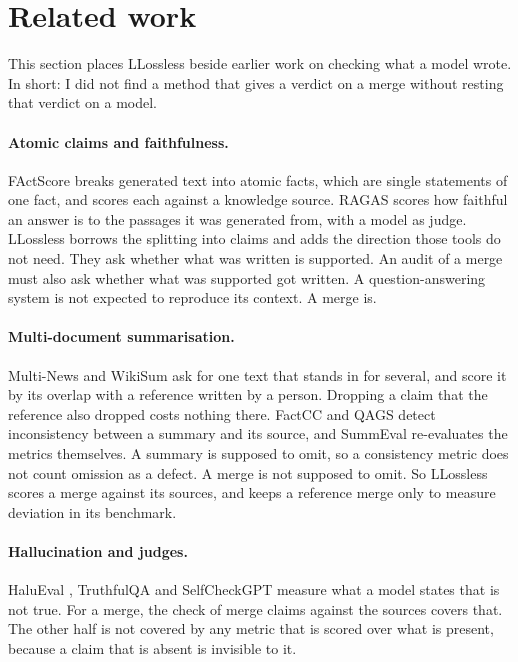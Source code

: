 \section{Related work}
\label{sec:related}

This section places LLossless beside earlier work on checking what a model wrote. In short: I did not find a method that gives a verdict on a merge without resting that verdict on a model.

\paragraph{Atomic claims and faithfulness.} FActScore \citep{min2023factscore} breaks generated text into atomic facts, which are single statements of one fact, and scores each against a knowledge source. RAGAS \citep{es2023ragas} scores how faithful an answer is to the passages it was generated from, with a model as judge. LLossless borrows the splitting into claims and adds the direction those tools do not need. They ask whether what was written is supported. An audit of a merge must also ask whether what was supported got written. A question-answering system is not expected to reproduce its context. A merge is.

\paragraph{Multi-document summarisation.} Multi-News \citep{fabbri2019multinews} and WikiSum \citep{liu2018wikisum} ask for one text that stands in for several, and score it by its overlap with a reference written by a person. Dropping a claim that the reference also dropped costs nothing there. FactCC \citep{kryscinski2019factcc} and QAGS \citep{wang2020qags} detect inconsistency between a summary and its source, and SummEval \citep{fabbri2020summeval} re-evaluates the metrics themselves. A summary is supposed to omit, so a consistency metric does not count omission as a defect. A merge is not supposed to omit. So LLossless scores a merge against its sources, and keeps a reference merge only to measure deviation in its benchmark.

\paragraph{Hallucination and judges.} HaluEval \citep{li2023halueval}, TruthfulQA \citep{lin2021truthfulqa} and SelfCheckGPT \citep{manakul2023selfcheckgpt} measure what a model states that is not true. For a merge, the check of merge claims against the sources covers that. The other half is not covered by any metric that is scored over what is present, because a claim that is absent is invisible to it.


